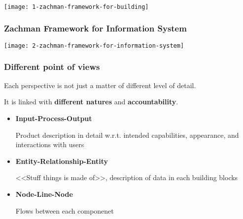 \begin{center}
\texttt{[image: 1-zachman-framework-for-building]}
\end{center}

\subsubsection{Zachman Framework for Information System}
\begin{center}
\texttt{[image: 2-zachman-framework-for-information-system]}
\end{center}

\subsubsection{Different point of views}
Each perspective is not just a matter of different level of detail.

It is linked with \textbf{different natures} and \textbf{accountability}.

\begin{itemize}
	\item \textbf{Input-Process-Output}
	
	Product description in detail w.r.t. intended capabilities, appearance, and interactions with users
	
	\item \textbf{Entity-Relationship-Entity}
	
	<<Stuff things is made of>>, description of data in each building blocks
	
	\item \textbf{Node-Line-Node}
	
	Flows between each componenet
	
\end{itemize}













